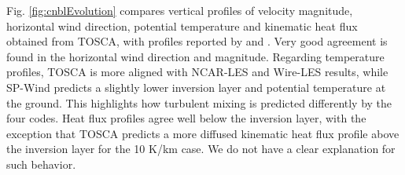 \documentclass[journal abbreviation, manuscript]{copernicus}
\begin{document}
Fig. \ref{fig:cnblEvolution} compares vertical profiles of velocity magnitude, horizontal wind direction, potential temperature and kinematic heat flux obtained from TOSCA, with profiles reported by \cite{2016_AllaertsPhD, 2013_AbkarPortèAgel} and \cite{2014_Pedersen}.
Very good agreement is found in the horizontal wind direction and magnitude. Regarding temperature profiles, TOSCA is more aligned with NCAR-LES and Wire-LES results, while SP-Wind predicts a slightly lower inversion layer and potential temperature at the ground. This highlights how turbulent mixing is predicted differently by the four codes. Heat flux profiles agree well below the inversion layer, with the exception that TOSCA predicts a more diffused kinematic heat flux profile above the inversion layer for the 10 K/km case. We do not have a clear explanation for such behavior.
\end{document}
